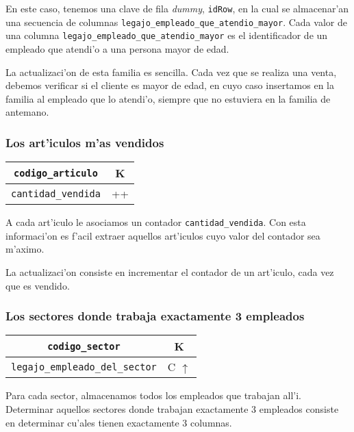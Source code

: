 En este caso, tenemos una clave de fila \textit{dummy}, \texttt{idRow}, en la cual se almacenar'an una secuencia de columnas \texttt{legajo\_empleado\_que\_atendio\_mayor}. Cada valor de una columna \texttt{legajo\_empleado\_que\_atendio\_mayor} es el identificador de un empleado que atendi'o a una persona mayor de edad.

La actualizaci'on de esta familia es sencilla. Cada vez que se realiza una venta, debemos verificar si el cliente es mayor de edad, en cuyo caso insertamos en la familia al empleado que lo atendi'o, siempre que no estuviera en la familia de antemano.

\subsubsection{Los art'iculos m'as vendidos}

\begin{center}
\begin{tabular}{|c|c|}
\hline
\texttt{codigo\_articulo} & K\\
\hline
\texttt{cantidad\_vendida} & ++\\
\hline
\end{tabular}
\end{center}

A cada art'iculo le asociamos un contador \texttt{cantidad\_vendida}. Con esta informaci'on es f'acil extraer aquellos art'iculos cuyo valor del contador sea m'aximo.

La actualizaci'on consiste en incrementar el contador de un art'iculo, cada vez que es vendido.

\subsubsection{Los sectores donde trabaja exactamente 3 empleados}

\begin{center}
\begin{tabular}{|c|c|}
\hline
\texttt{codigo\_sector} & K\\
\hline
\texttt{legajo\_empleado\_del\_sector} & C $\uparrow$\\
\hline
\end{tabular}
\end{center}

Para cada sector, almacenamos todos los empleados que trabajan all'i. Determinar aquellos sectores donde trabajan exactamente 3 empleados consiste en determinar cu'ales tienen exactamente 3 columnas.

